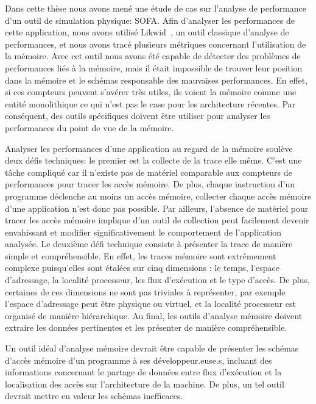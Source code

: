 Dans cette thèse nous avons mené une étude de cas sur l'analyse de performance d'un outil de simulation physique: \gls{SOFA}.
Afin d'analyser les performances de cette application, nous avons utilisé \gls{Likwid}~\cite{Treibig10LIKWID}, un outil classique d'analyse de performances, et nous avons tracé plusieurs métriques concernant l'utilisation de la mémoire.
Avec cet outil nous avons été capable de détecter  des problèmes de performances liés à la mémoire, mais il était impossible de trouver leur position dans la mémoire et le schémas responsable des mauvaises performances.
En effet, si ces compteurs peuvent s'avérer très utiles, ils voient la mémoire comme une entité monolithique ce qui n'est pas le case pour les architecture récentes.
Par conséquent, des outils spécifiques doivent être utiliser pour analyser les performances du point de vue de la mémoire.

Analyser les performances d'une application au regard de la mémoire soulève deux défis techniques: le premier est la collecte de la trace elle même.
C'est une t\^ache compliqué car il n'existe pas de matériel comparable aux compteurs de performances pour tracer les accès mémoire.
De plus, chaque instruction d'un programme déclenche au moins un accès mémoire, collecter chaque accès mémoire d'une application n'est donc pas possible.
Par ailleurs, l'absence de matériel pour tracer les accès mémoire implique d'un outil de collection peut facilement devenir envahissant et modifier  significativement le comportement de l'application analysée.
Le deuxième défi technique consiste à présenter la trace de manière simple et compréhensible.
En effet, les traces mémoire sont extrêmement complexe puisqu'elles sont étalées sur cinq dimensions : le temps, l'espace d'adressage, la localité processeur, les flux d'exécution et le type d'accès.
De plus, certaines de ces dimensions ne sont pas triviales à représenter, par exemple l'espace d'adressage peut être physique ou virtuel, et la localité processeur est organisé de manière hiérarchique.
Au final, les outils d'analyse mémoire doivent extraire les données pertinentes et les présenter de manière compréhensible.

Un outil idéal d'analyse mémoire devrait être capable de présenter les schémas d'accès mémoire d'un programme à ses développeur.euse.s, incluant des informations concernant le partage de données entre flux d'exécution et la localisation des accès  sur l'architecture de la machine.
De plus, un tel outil devrait mettre en valeur les schémas inefficaces.

